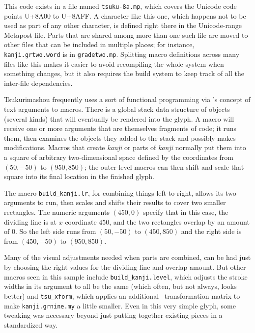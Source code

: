 \documentclass{ltugboat}
\begin{document}
This code exists in a file named \verb|tsuku-8a.mp|, which covers the
Unicode code points U+8A00 to U+8AFF.  A character like this one, which
happens not to be used as part of any other character, is defined right
there in the Unicode-range Metapost file.  Parts that are shared among more
than one such file are moved to other files that can be included in multiple
places; for instance, \verb|kanji.grtwo.word| is in \verb|gradetwo.mp|. 
Splitting macro definitions across many files like this makes it easier to
avoid recompiling the whole system when something changes, but it also
requires the build system to keep track of all the inter-file dependencies.

Tsukurimashou frequently uses a sort of functional programming via \MF's
concept of
\linebreak%
 text arguments to macros.  There is a global stack data structure
of objects (several kinds) that will eventually be rendered into the glyph. 
A macro will receive one or more arguments that are themselves fragments of
code; it runs them, then examines the objects they added to the stack and
possibly makes modifications.  Macros that create \emph{kanji} or parts of \emph{kanji}
normally put them into a square of arbitrary two-dimensional space
defined by the coordinates from $(50,-50)$ to $(950,850)$; the outer-level
macros can then shift and scale that square into its final location in the
finished glyph.

The macro
\verb|build_kanji.lr|, for combining 
\linebreak%
things left-to-right, allows its two
arguments to run, then scales and shifts their results to cover two
\linebreak%
 smaller
rectangles.  The numeric arguments $(450,0)$ specify that in this case, the
dividing line is at $x$ coordinate $450$, and the two rectangles overlap by
an amount of $0$.  So the left side runs from $(50,-50)$ to $(450,850)$ and
the right side is from $(450,-50)$ to $(950,850)$.

Many of the visual adjustments needed when parts are combined, can be had
just by choosing the right values for the dividing line and overlap amount. 
But other macros seen in this sample include \verb|build_kanji.level|, which
adjusts the stroke widths in its argument to all be the same (which often,
but not always, looks better) and \verb|tsu_xform|, which applies an additional
\MF\ transformation matrix to make \verb|kanji.grnine.my| a little smaller.  Even
in this very simple glyph, some tweaking was necessary beyond just
putting together existing pieces in a standardized way.
\end{document}
